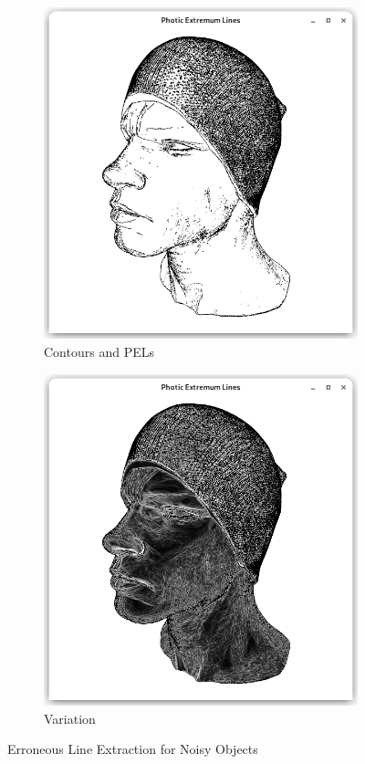 \documentclass[9pt,fleqn,twoside,twocolumn]{stdglobal}
\begin{document}
    \begin{figure}[h]
      \centering
      \begin{subfigure}[b]{0.49\linewidth}
        \centering
        \includegraphics[width=\textwidth,trim={15px 15 15 50},clip]{images/head-contour-pel-shader.png}
        \caption{Contours and PELs}
      \end{subfigure}
      \begin{subfigure}[b]{0.49\linewidth}
        \centering
        \includegraphics[width=\textwidth,trim={15px 15 15 50},clip]{images/head-light-variation.png}
        \caption{Variation}
      \end{subfigure}
      \caption{Erroneous Line Extraction for Noisy Objects}
    \end{figure}
\end{document}
